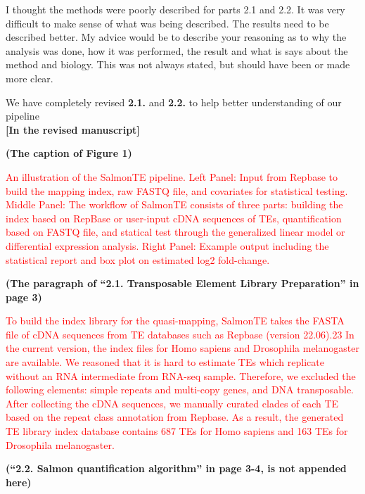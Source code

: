 \documentclass[10pt]{article}
\begin{document}
\begin{response}{
I thought the methods were poorly described for parts 2.1 and 2.2. It was very difficult to make sense of what was being described. The results need to be described better. My advice would be to describe your reasoning as to why the analysis was done, how it was performed, the result and what is says about the method and biology. This was not always stated, but should have been or made more clear.}

We have completely revised \textbf{2.1.} and  \textbf{2.2.} to help better understanding of our pipeline\\


\textbf{[In the revised manuscript]} 

\textbf{(The caption of Figure 1)}

\textcolor{red}{
An illustration of the SalmonTE pipeline. Left Panel: Input from Repbase to build the mapping index, raw FASTQ file, and covariates for statistical testing. Middle Panel: The workflow of SalmonTE consists of three parts: building the index based on RepBase or user-input cDNA sequences of TEs, quantification based on FASTQ file, and statical test through the generalized linear model or differential expression analysis. Right Panel: Example output including the statistical report and box plot on estimated log2 fold-change.
}

\textbf{(The paragraph of ``2.1. Transposable Element Library Preparation'' in page 3)}

\textcolor{red}{
To build the index library for the quasi-mapping, SalmonTE takes the FASTA file of cDNA sequences from TE databases such as Repbase (version 22.06).23 In the current version, the index files for Homo sapiens and Drosophila melanogaster are available. We reasoned that it is hard to estimate TEs which replicate without an RNA intermediate from RNA-seq sample.
Therefore, we excluded the following elements: simple repeats and multi-copy genes, and DNA transposable. After collecting the cDNA sequences, we manually curated clades of each TE based on the repeat class annotation from Repbase.
As a result, the generated TE library index database contains 687 TEs for Homo sapiens and 163 TEs for Drosophila melanogaster.

}

\textbf{(``2.2. Salmon quantification algorithm'' in page 3-4, is not appended here)}

\end{response}
\end{document}
